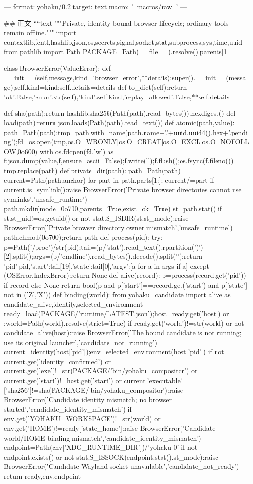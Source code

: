---
format: yohaku/0.2
target: text
macro: '[[macros/raw]]'
---

## 正文
````text
"""Private, identity-bound browser lifecycle; ordinary tools remain offline."""
import contextlib,fcntl,hashlib,json,os,secrets,signal,socket,stat,subprocess,sys,time,uuid
from pathlib import Path
PACKAGE=Path(__file__).resolve().parents[1]

class BrowserError(ValueError):
 def __init__(self,message,kind='browser_error',**details):super().__init__(message);self.kind=kind;self.details=details
 def to_dict(self):return {'ok':False,'error':str(self),'kind':self.kind,'replay_allowed':False,**self.details}

def sha(path):return hashlib.sha256(Path(path).read_bytes()).hexdigest()
def load(path):return json.loads(Path(path).read_text())
def atomic(path,value):
 path=Path(path);tmp=path.with_name(path.name+'.'+uuid.uuid4().hex+'.pending');fd=os.open(tmp,os.O_WRONLY|os.O_CREAT|os.O_EXCL|os.O_NOFOLLOW,0o600)
 with os.fdopen(fd,'w') as f:json.dump(value,f,ensure_ascii=False);f.write('\n');f.flush();os.fsync(f.fileno())
 tmp.replace(path)
def private_dir(path):
 path=Path(path)
 current=Path(path.anchor)
 for part in path.parts[1:]:
  current/=part
  if current.is_symlink():raise BrowserError('Private browser directories cannot use symlinks','unsafe_runtime')
 path.mkdir(mode=0o700,parents=True,exist_ok=True)
 st=path.stat()
 if st.st_uid!=os.getuid() or not stat.S_ISDIR(st.st_mode):raise BrowserError('Private browser directory owner mismatch','unsafe_runtime')
 path.chmod(0o700);return path
def process(pid):
 try:
  p=Path('/proc')/str(pid);tail=(p/'stat').read_text().rpartition(')')[2].split();args=(p/'cmdline').read_bytes().decode().split('\0');return {'pid':pid,'start':tail[19],'state':tail[0],'argv':[a for a in args if a]}
 except (OSError,IndexError):return None
def alive(record):
 p=process(record.get('pid')) if record else None
 return bool(p and p['start']==record.get('start') and p['state'] not in ('Z','X'))
def binding(world):
 from yohaku_candidate import alive as candidate_alive,identity,selected_environment
 ready=load(PACKAGE/'runtime/LATEST.json');host=ready.get('host') or {};world=Path(world).resolve(strict=True)
 if ready.get('world')!=str(world) or not candidate_alive(host):raise BrowserError('The bound candidate is not running; use its original launcher','candidate_not_running')
 current=identity(host['pid']);env=selected_environment(host['pid'])
 if not current.get('identity_confirmed') or current.get('exe')!=str(PACKAGE/'bin/yohaku_compositor') or current.get('start')!=host.get('start') or current['executable']['sha256']!=sha(PACKAGE/'bin/yohaku_compositor'):raise BrowserError('Candidate identity mismatch; no browser started','candidate_identity_mismatch')
 if env.get('YOHAKU_WORKSPACE')!=str(world) or env.get('HOME')!=ready['state_home']:raise BrowserError('Candidate world/HOME binding mismatch','candidate_identity_mismatch')
 endpoint=Path(env['XDG_RUNTIME_DIR'])/'yohaku-0'
 if not endpoint.exists() or not stat.S_ISSOCK(endpoint.stat().st_mode):raise BrowserError('Candidate Wayland socket unavailable','candidate_not_ready')
 return ready,env,endpoint


